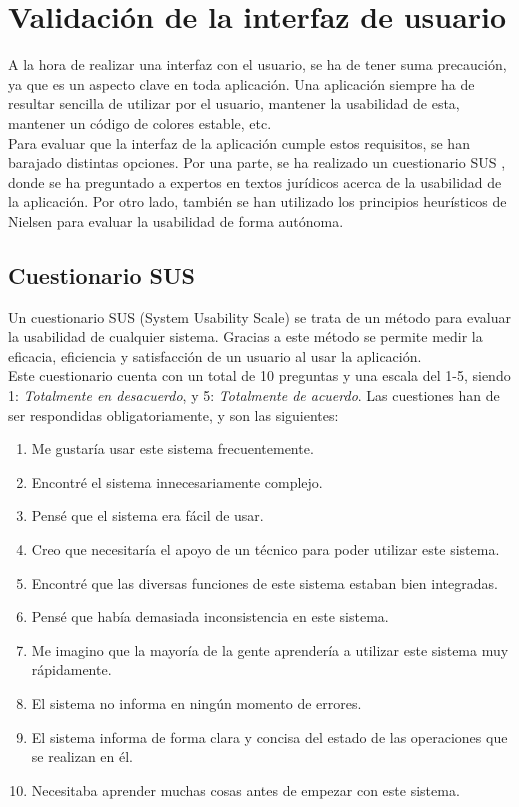 \section{Validación de la interfaz de usuario}

A la hora de realizar una interfaz con el usuario, se ha de tener suma precaución, ya que es un aspecto clave en toda aplicación. Una aplicación siempre ha de resultar sencilla de utilizar por el usuario, mantener la usabilidad de esta, mantener un código de colores estable, etc.
\\

Para evaluar que la interfaz de la aplicación cumple estos requisitos, se han barajado distintas opciones. Por una parte, se ha realizado un cuestionario SUS \cite{sus}, donde se ha preguntado a expertos en textos jurídicos acerca de la usabilidad de la aplicación. Por otro lado, también se han utilizado los principios heurísticos de Nielsen \cite{nielsen} para evaluar la usabilidad de forma autónoma. 


\subsection{Cuestionario SUS}

Un cuestionario SUS (System Usability Scale) se trata de un método para evaluar la usabilidad de cualquier sistema. Gracias a este método se permite medir la eficacia, eficiencia y satisfacción de un usuario al usar la aplicación.
\\

Este cuestionario cuenta con un total de 10 preguntas y una escala del 1-5, siendo 1: {\it Totalmente en desacuerdo}, y 5: {\it Totalmente de acuerdo}. Las cuestiones han de ser respondidas obligatoriamente, y son las siguientes:

\begin{enumerate}
    \item Me gustaría usar este sistema frecuentemente.
    \item Encontré el sistema innecesariamente complejo.
    \item Pensé que el sistema era fácil de usar.
    \item Creo que necesitaría el apoyo de un técnico para poder utilizar este sistema.
    \item Encontré que las diversas funciones de este sistema estaban bien integradas.
    \item Pensé que había demasiada inconsistencia en este sistema.
    \item Me imagino que la mayoría de la gente aprendería a utilizar este sistema muy rápidamente.
    \item El sistema no informa en ningún momento de errores.
    \item  El sistema informa de forma clara y concisa del estado de las operaciones que se realizan en él.
    \item Necesitaba aprender muchas cosas antes de empezar con este sistema.
\end{enumerate}

